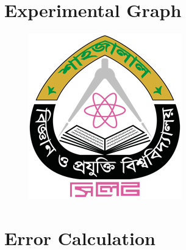 \section*{Experimental Graph  }
\begin{figure}[h]
\begin{center}
\includegraphics[scale=2.5]{fig/SUST_Logo.png} %
\end{center}
\end{figure}
\newpage
\section*{Error Calculation }

